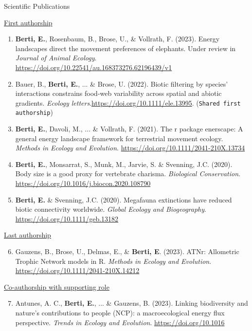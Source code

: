 \documentclass{resume} %
\begin{document}
\begin{rSection}{Scientific Publications}

{\underline{First authorship}}
\begin{enumerate}[leftmargin=0pt]
    \itemsep-1ex
    \item{\textbf{Berti, E.}, Rosenbaum, B., Brose, U., \& Vollrath, F. (2023). Energy landscapes direct the movement preferences of elephants. Under review in \textit{Journal of Animal Ecology}. \url{https://doi.org/10.22541/au.168373276.62196439/v1}}
    \item{Bauer, B., \textbf{Berti, E.}, ... \& Brose, U. (2022). Biotic filtering by species’ interactions constrains food-web variability across spatial and abiotic gradients. \textit{Ecology letters}.\url{https://doi.org/10.1111/ele.13995}. (\texttt{Shared first authorship})}
    \item{\textbf{Berti, E.}, Davoli, M., ... \& Vollrath, F. (2021). The r package enerscape: A general energy landscape framework for terrestrial movement ecology. \textit{Methods in Ecology and Evolution}. \url{https://doi.org/10.1111/2041-210X.13734}}
    \item{\textbf{Berti, E.}, Monsarrat, S., Munk, M., Jarvie, S. \& Svenning, J.C. (2020). Body size is a good proxy for vertebrate charisma. \textit{Biological Conservation}. \url{https://doi.org/10.1016/j.biocon.2020.108790}}
    \item{\textbf{Berti, E.} \& Svenning, J.C. (2020). Megafauna extinctions have reduced biotic connectivity worldwide. \textit{Global Ecology and Biogeography}. \url{https://doi.org/10.1111/geb.13182}}
\end{enumerate}
{\underline{Last authorship}}
\begin{enumerate}[leftmargin=0pt]
    \setcounter{enumi}{5}
    \itemsep-1ex
    \item{Gauzens, B., Brose, U., Delmas, E., \& \textbf{Berti, E}. (2023). ATNr: Allometric Trophic Network models in R. \textit{Methods in Ecology and Evolution}. \url{https://doi.org/10.1111/2041-210X.14212}}
\end{enumerate}
{\underline{Co-authorship with supporting role}}
\begin{enumerate}[leftmargin=0pt]
    \setcounter{enumi}{6}
    \itemsep-1ex
    \item{Antunes, A. C., \textbf{Berti, E.}, ... \& Gauzens, B. (2023). Linking biodiversity and nature’s contributions to people (NCP): a macroecological energy flux perspective. \textit{Trends in Ecology and Evolution}. \href{https://doi.org/10.1016/j.tree.2024.01.004}{https://doi.org/10.1016}}

\end{enumerate}
\end{rSection}
\end{document}
